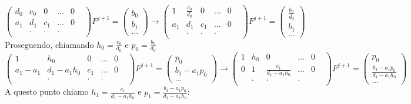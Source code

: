 \documentclass[]{article}
\newcommand{\lr}[3]{\ensuremath{\left#1 #3 \right#2}}
\newcommand{\lrt}[1]{\lr{(}{)}{#1}}
\numberwithin{equation}{subsection}
\begin{document}
$$\lrt{\begin{array}{cccccc}
d_0&c_0&0&...&0\\
a_1&d_1&c_1&...&0\\
&.&.&.&&\\
\end{array}} F^{j+1} = \lrt{\begin{array}{c}
b_0\\b_1\\...
\end{array}}\to
\lrt{\begin{array}{cccccc}
1&\frac{c_0}{d_0}&0&...&0\\
a_1&d_1&c_1&...&0\\
&.&.&.&&\\
\end{array}} F^{j+1} = \lrt{\begin{array}{c}
\frac{b_0}{d_0}\\b_1\\...
\end{array}}
$$
Proseguendo, chiamando $h_0 = \frac{c_0}{d_0}$ e $p_0 = \frac{b_0}{d_0}$
$$
\lrt{\begin{array}{cccccc}
1&h_0&0&...&0\\
a_1-a_1 &d_1 -a_1 h_0&c_1&...&0\\
&.&.&.&&\\
\end{array}} F^{j+1} = \lrt{\begin{array}{c}
p_0\\b_1-a_1p_0\\...
\end{array}}\to
\lrt{\begin{array}{cccccc}
1&h_0&0&...&0\\
0 &1&\frac{c_1}{d_1 -a_1 h_0}&...&0\\
&.&.&.&&\\
\end{array}} F^{j+1} = \lrt{\begin{array}{c}
p_0\\\frac{b_1-a_1p_0}{d_1 -a_1 h_0}\\...
\end{array}}
$$
A questo punto chiamo $h_1 = \frac{c_1}{d_1 -a_1 h_0}$ e $p_1=\frac{b_1-a_1p_0}{d_1 -a_1 h_0}$: 
\end{document}
